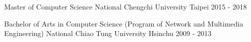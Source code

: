 

\begin{cventries}

  \cventry
    {Master of Computer Science} %
    {National Chengchi University} %
    {Taipei} %
    {2015 - 2018} %
    {
    }

  \cventry
    {Bachelor of Arts in Computer Science (Program of Network and Multimedia Engineering)} %
    {National Chiao Tung University} %
    {Hsinchu} %
    {2009 - 2013} %
    {
    }

\end{cventries}
